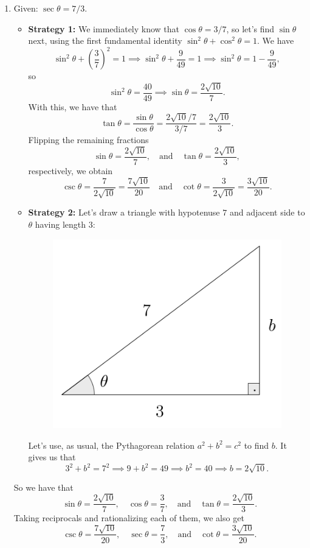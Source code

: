 \documentclass{ximera}
\begin{document}
\begin{example}
\begin{enumerate}[label=\alph*.]
  \item Given: $\sec\theta = 7/3$.

    \begin{explanation}
      \begin{itemize}
      \item {\bf Strategy 1:} We immediately know that $\cos\theta = 3/7$, so let's find $\sin\theta$ next, using the first fundamental identity $\sin^2\theta+\cos^2\theta=1$. We have $$\sin^2\theta +\left(\frac{3}{7}\right)^2=1 \implies \sin^2\theta+\frac{9}{49}=1 \implies \sin^2\theta = 1-\frac{9}{49},$$so $$\sin^2\theta = \frac{40}{49} \implies \sin\theta = \frac{2\sqrt{10}}{7}.$$ With this, we have that \[   \tan\theta = \frac{\sin\theta}{\cos\theta} = \frac{2\sqrt{10}/7}{3/7} = \frac{2\sqrt{10}}{3}.  \]Flipping the remaining fractions $$\sin\theta = \frac{2\sqrt{10}}{7}, \quad\mbox{and}\quad \tan\theta = \frac{2\sqrt{10}}{3},$$respectively, we obtain $$\csc\theta = \frac{7}{2\sqrt{10}}  =\frac{7\sqrt{10}}{20}\quad\mbox{and}\quad \cot\theta = \frac{3}{2\sqrt{10}}=\frac{3\sqrt{10}}{20}.$$
      \item {\bf Strategy 2:} Let's draw a triangle with hypotenuse $7$ and adjacent side to $\theta$ having length $3$: \begin{figure}[h]
          \centering
          \includegraphics[scale=.3]{./figures/9-1-3-triangle-sec-7-3.png}
        \end{figure}Let's use, as usual, the Pythagorean relation $a^2+b^2=c^2$ to find $b$. It gives us that $$3^2+b^2=7^2\implies 9+b^2=49\implies b^2 = 40\implies b=2\sqrt{10}.$$ 
      \end{itemize}So we have that $$\sin\theta=\frac{2\sqrt{10}}{7},\quad\cos\theta=\frac{3}{7},\quad\mbox{and}\quad \tan\theta=\frac{2\sqrt{10}}{3}.$$Taking reciprocals and rationalizing each of them, we also get$$\csc\theta=\frac{7\sqrt{10}}{20},\quad\sec\theta=\frac{7}{3},\quad\mbox{and}\quad \cot\theta=\frac{3\sqrt{10}}{20}.$$
    \end{explanation}
    

\end{enumerate}
\end{example}
\end{document}
